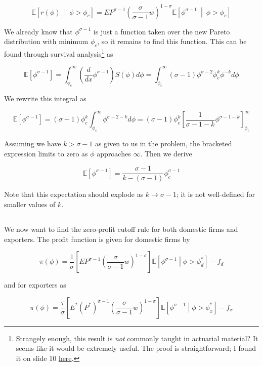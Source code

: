 \documentclass[12pt, letterpaper]{article}
\newcommand{\Ex}[1]{\mathbb{E}\left[#1\right]}
\begin{document}
	\[  \Ex{r(\phi)\ \middle|\ \phi > \phi_c}  = EP^{\sigma - 1} \left( \frac{\sigma}{\sigma - 1} w \right)^{1 - \sigma} \Ex{ \phi^{\sigma - 1}\ \middle|\ \phi > \phi_c}  \]

	We already know that \(\phi^{\sigma - 1}\) is just a function taken over the new Pareto distribution with minimum \(\phi_c\), so it remains to find this function. This can be found through survival analysis\footnote{Strangely enough, this result is \emph{not} commonly taught in actuarial material? It seems like it would be extremely useful. The proof is straightforward; I found it on slide 10 \href{https://archive.math.arizona.edu/jwatkins/B3_expectedvalue.pdf}{here}.} as 

	\[ \Ex{\phi^{\sigma - 1}} = \int_{\phi_c}^\infty \left(\frac{d}{dx} \phi^{\sigma - 1} \right) S(\phi) d\phi = \int_{\phi_c}^\infty (\sigma - 1) \phi^{\sigma - 2} \phi_c^k \phi^{-k} d\phi \]

	We rewrite this integral as

	\[ \Ex{\phi^{\sigma - 1}} = (\sigma - 1) \phi_c^k \int_{\phi_c}^\infty \phi^{\sigma - 2 - k} d\phi = (\sigma - 1) \phi_c^k \left[ \frac{1}{\sigma - 1 - k} \phi^{\sigma - 1 - k} \right]_{\phi_c}^\infty    \]

	Assuming we have \(k > \sigma - 1\) as given to us in the problem, the bracketed expression limits to zero as \(\phi\) approaches \(\infty\). Then we derive

	\[ \Ex{\phi^{\sigma - 1}} = \frac{\sigma - 1}{k - (\sigma - 1)} \phi_c^{\sigma - 1}     \]

	Note that this expectation should explode as \(k \rightarrow \sigma - 1\); it is not well-defined for smaller values of \(k\). 

    \subsection{}

	We now want to find the zero-profit cutoff rule for both domestic firms and exporters. The profit function is given for domestic firms by

	\[ \pi(\phi) = \frac{1}{\sigma} \left[EP^{\sigma - 1} \left( \frac{\sigma}{\sigma - 1} w \right)^{1 - \sigma}\right] \Ex{\phi^{\sigma - 1} \middle| \phi > \phi_d^*} - f_d        \]

	and for exporters as

	\[ \pi(\phi) = \frac{\tau}{\sigma} \left[ E^*\left(P^*\right)^{\sigma - 1} \left( \frac{\sigma}{\sigma - 1} w \right)^{1 - \sigma}\right] \Ex{\phi^{\sigma - 1} \middle| \phi > \phi_x^*} - f_x        \]
\end{document}

